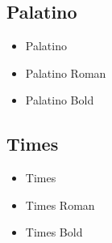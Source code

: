 
    \subsection{Palatino}
    \begin{itemize}
        \item {\selectfont Palatino}
        \item {\selectfont Palatino Roman}
        \item {\selectfont Palatino Bold}
    \end{itemize}




    \subsection{Times}
    \begin{itemize}
        \item {\selectfont Times}
        \item {\selectfont Times Roman}
        \item {\selectfont Times Bold}
    \end{itemize}


